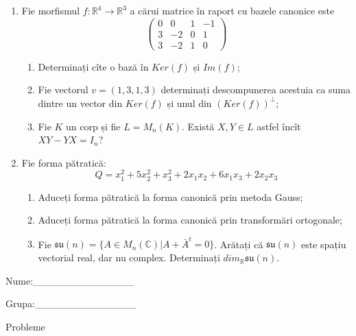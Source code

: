 \documentclass{article}
\begin{document}
\begin{enumerate}
 \item Fie morfismul $f:\mathbb{R}^4 \to \mathbb{R}^3$ a cărui matrice în raport cu bazele canonice este
$$\begin{pmatrix}
0&0&1&-1\\
3&-2&0&1\\
3&-2&1&0
\end{pmatrix}$$

\begin{enumerate}
\item Determinați cîte o bază în $Ker(f)$ și $Im(f)$;
\item Fie vectorul $v=(1,3,1,3)$ determinați descompunerea acestuia ca suma dintre un vector din $Ker(f)$ și unul din $(Ker(f))^\perp$;
\item Fie $K$ un corp și fie $L=M_n(K)$. Există $X,Y \in L$ astfel încît $XY-YX=I_n$?  
\end{enumerate}
\item Fie forma pătratică:
$$Q= x_1^2+5x_2^2+x_3^2+2x_1x_2+6x_1x_3+2x_2x_3$$

\begin{enumerate}
\item Aduceți forma pătratică la forma canonică prin metoda Gauss;
\item Aduceți forma pătratică la forma canonică prin transformări ortogonale;
\item Fie $\mathfrak{su}(n)=\{ A \in M_n(\mathbb{C}) | A+\bar{A}^t=0\}$. Arătați că $\mathfrak{su}(n)$ este spațiu vectorial real, dar nu complex.
Determinați $dim_{\mathbb{R}}\mathfrak{su}(n)$.
\end{enumerate}
\end{enumerate}
\newpage
\begin{flushright}
Nume:\_\_\_\_\_\_\_\_\_\_\_\_\_\_
 
 
Grupa:\_\_\_\_\_\_\_\_\_\_\_\_\_\_
\end{flushright}
\begin{center}
\vspace{2cm}
{\Large Probleme}
\vspace{2cm}
\end{center}
\end{document}
